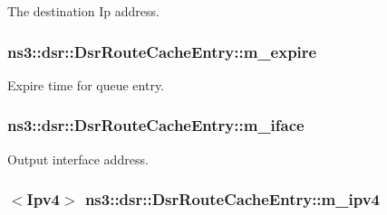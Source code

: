 The destination Ip address. 

\subsubsection[{\texorpdfstring{m\+\_\+expire}{m_expire}}]{ ns3\+::dsr\+::\+Dsr\+Route\+Cache\+Entry\+::m\+\_\+expire\hspace{0.3cm}{\ttfamily [private]}}\hypertarget{classns3_1_1dsr_1_1DsrRouteCacheEntry_a3355b3313a221da25a3fced528c526e9}{}\label{classns3_1_1dsr_1_1DsrRouteCacheEntry_a3355b3313a221da25a3fced528c526e9}


Expire time for queue entry. 

\subsubsection[{\texorpdfstring{m\+\_\+iface}{m_iface}}]{ ns3\+::dsr\+::\+Dsr\+Route\+Cache\+Entry\+::m\+\_\+iface\hspace{0.3cm}{\ttfamily [private]}}\hypertarget{classns3_1_1dsr_1_1DsrRouteCacheEntry_a9b83f6f236a92a0fde432d55d5b6617f}{}\label{classns3_1_1dsr_1_1DsrRouteCacheEntry_a9b83f6f236a92a0fde432d55d5b6617f}


Output interface address. 

\subsubsection[{\texorpdfstring{m\+\_\+ipv4}{m_ipv4}}]{$<${\bf Ipv4}$>$ ns3\+::dsr\+::\+Dsr\+Route\+Cache\+Entry\+::m\+\_\+ipv4\hspace{0.3cm}{\ttfamily [private]}}\hypertarget{classns3_1_1dsr_1_1DsrRouteCacheEntry_a82fe317debad049498ac6e94cf3091a6}{}\label{classns3_1_1dsr_1_1DsrRouteCacheEntry_a82fe317debad049498ac6e94cf3091a6}


